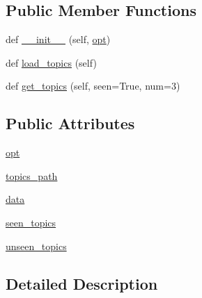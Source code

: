 \subsection*{Public Member Functions}
\begin{DoxyCompactItemize}
\item 
def \hyperlink{classprojects_1_1wizard__of__wikipedia_1_1mturk__evaluation__task_1_1worlds_1_1TopicsGenerator_ab0591d0cf65c47ce1341247bd0c79d36}{\+\_\+\+\_\+init\+\_\+\+\_\+} (self, \hyperlink{classprojects_1_1wizard__of__wikipedia_1_1mturk__evaluation__task_1_1worlds_1_1TopicsGenerator_a069f85cf871b5e326575e94730872786}{opt})
\item 
def \hyperlink{classprojects_1_1wizard__of__wikipedia_1_1mturk__evaluation__task_1_1worlds_1_1TopicsGenerator_a19eb72588e1025eb43d8c24ea9b91593}{load\+\_\+topics} (self)
\item 
def \hyperlink{classprojects_1_1wizard__of__wikipedia_1_1mturk__evaluation__task_1_1worlds_1_1TopicsGenerator_ad4b8871760a65ea4685005b013d6e372}{get\+\_\+topics} (self, seen=True, num=3)
\end{DoxyCompactItemize}
\subsection*{Public Attributes}
\begin{DoxyCompactItemize}
\item 
\hyperlink{classprojects_1_1wizard__of__wikipedia_1_1mturk__evaluation__task_1_1worlds_1_1TopicsGenerator_a069f85cf871b5e326575e94730872786}{opt}
\item 
\hyperlink{classprojects_1_1wizard__of__wikipedia_1_1mturk__evaluation__task_1_1worlds_1_1TopicsGenerator_a573fa066c488ab3a4251408c85cef7f7}{topics\+\_\+path}
\item 
\hyperlink{classprojects_1_1wizard__of__wikipedia_1_1mturk__evaluation__task_1_1worlds_1_1TopicsGenerator_a55a55c6d796feb5538175f71511ef009}{data}
\item 
\hyperlink{classprojects_1_1wizard__of__wikipedia_1_1mturk__evaluation__task_1_1worlds_1_1TopicsGenerator_aa6face03045e7bcc82847b93d6e2b2f0}{seen\+\_\+topics}
\item 
\hyperlink{classprojects_1_1wizard__of__wikipedia_1_1mturk__evaluation__task_1_1worlds_1_1TopicsGenerator_a1c81736776ac55ce8fc2b5bd72a58e78}{unseen\+\_\+topics}
\end{DoxyCompactItemize}


\subsection{Detailed Description}


